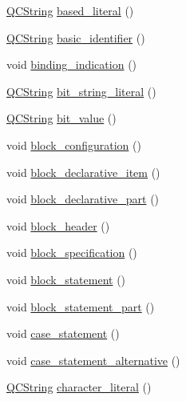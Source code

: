 \begin{DoxyCompactItemize}
\hyperlink{class_q_c_string}{Q\+C\+String} \hyperlink{classvhdl_1_1parser_1_1_vhdl_parser_ad51f5f8a07045fc20ff786883698fcc7}{based\+\_\+literal} ()
\item 
\hyperlink{class_q_c_string}{Q\+C\+String} \hyperlink{classvhdl_1_1parser_1_1_vhdl_parser_af36ddf93886623ce733509647640eb35}{basic\+\_\+identifier} ()
\item 
void \hyperlink{classvhdl_1_1parser_1_1_vhdl_parser_ab05782ac91fa9fdaf52584489e63d482}{binding\+\_\+indication} ()
\item 
\hyperlink{class_q_c_string}{Q\+C\+String} \hyperlink{classvhdl_1_1parser_1_1_vhdl_parser_a9e8b4d3e1b128db21e3b28dd52e1a03a}{bit\+\_\+string\+\_\+literal} ()
\item 
\hyperlink{class_q_c_string}{Q\+C\+String} \hyperlink{classvhdl_1_1parser_1_1_vhdl_parser_a168c0a186758b6509494c24a2c0eb105}{bit\+\_\+value} ()
\item 
void \hyperlink{classvhdl_1_1parser_1_1_vhdl_parser_a20c4497a2652cc5d703b92b698398789}{block\+\_\+configuration} ()
\item 
void \hyperlink{classvhdl_1_1parser_1_1_vhdl_parser_a9a4fb658ec60d8f5a12796a328bdd657}{block\+\_\+declarative\+\_\+item} ()
\item 
void \hyperlink{classvhdl_1_1parser_1_1_vhdl_parser_a630c63e62882a708f050c326fdce16d9}{block\+\_\+declarative\+\_\+part} ()
\item 
void \hyperlink{classvhdl_1_1parser_1_1_vhdl_parser_a69d90b3f3c0b744b1939cf6d64ee18c9}{block\+\_\+header} ()
\item 
void \hyperlink{classvhdl_1_1parser_1_1_vhdl_parser_afb14335210b662b4f5a1b3a98eb25101}{block\+\_\+specification} ()
\item 
void \hyperlink{classvhdl_1_1parser_1_1_vhdl_parser_a24818f918044519ffe2522c1c7c6af81}{block\+\_\+statement} ()
\item 
void \hyperlink{classvhdl_1_1parser_1_1_vhdl_parser_a58a293445df5b55b0e25589abf1c422f}{block\+\_\+statement\+\_\+part} ()
\item 
void \hyperlink{classvhdl_1_1parser_1_1_vhdl_parser_ad31c86c0c172ef1e72f2289fba14162c}{case\+\_\+statement} ()
\item 
void \hyperlink{classvhdl_1_1parser_1_1_vhdl_parser_a37f264ff9c6512380f716ec238cfd49a}{case\+\_\+statement\+\_\+alternative} ()
\item 
\hyperlink{class_q_c_string}{Q\+C\+String} \hyperlink{classvhdl_1_1parser_1_1_vhdl_parser_a0c58fce694b1b4c347f1712b2d7b695a}{character\+\_\+literal} ()
\item 

\end{DoxyCompactItemize}
